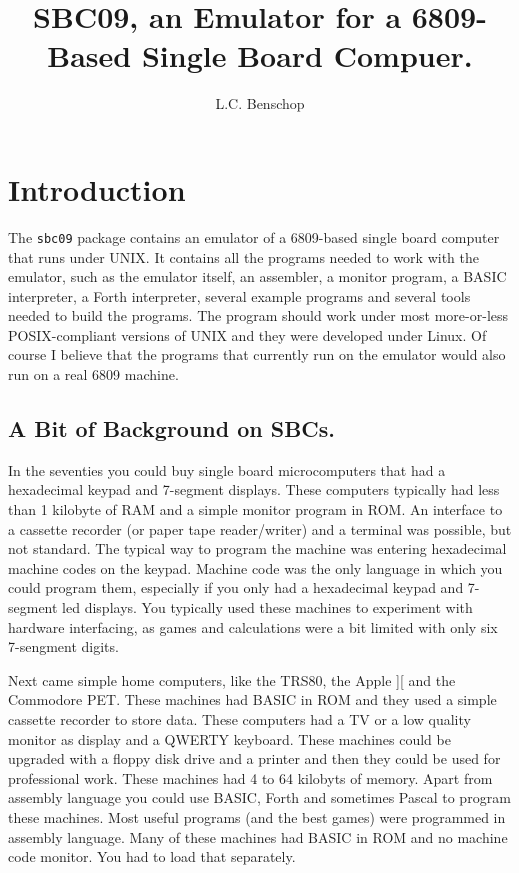 \title{SBC09, an Emulator for a 6809-Based Single Board Compuer.}
\author{L.C. Benschop}

\def\SetFigFont#1#2#3{\rm}

\maketitle
\tableofcontents
\chapter{Introduction}

The {\tt sbc09} package contains an emulator of a 6809-based single board
computer that runs under UNIX. It contains all the programs needed to work
with the emulator, such as the emulator itself, an assembler, a monitor
program, a BASIC interpreter, a Forth interpreter, several example programs
and several tools needed to build the programs. The program should work
under most more-or-less POSIX-compliant versions of UNIX and they were
developed under Linux. Of course I believe that the programs that currently
run on the emulator would also run on a real 6809 machine.

\section{A Bit of Background on SBCs.}

In the seventies you could buy single board microcomputers that had a
hexadecimal keypad and 7-segment displays. These computers typically had
less than 1 kilobyte of RAM and a simple monitor program in ROM. An
interface to a cassette recorder (or paper tape reader/writer) and a
terminal was possible, but not standard. The typical way to program the
machine was entering hexadecimal machine codes on the keypad. Machine code
was the only language in which you could program them, especially if you
only had a hexadecimal keypad and 7-segment led displays. You typically used
these machines to experiment with hardware interfacing, as games and
calculations were a bit limited with only six 7-sengment digits.

Next came simple home computers, like the TRS80, the Apple ][ and the
Commodore PET. These machines had BASIC in ROM and they used a simple
cassette recorder to store data. These computers had a TV or a low quality
monitor as display and a QWERTY keyboard. These machines could be upgraded
with a floppy disk drive and a printer and then they could be used for
professional work. These machines had 4 to 64 kilobyts of memory.
Apart from assembly language you could use BASIC, Forth
and sometimes Pascal to program these machines. Most useful programs (and
the best games) were programmed in assembly language. Many of these machines
had BASIC in ROM and no machine code monitor. You had to load that
separately.

